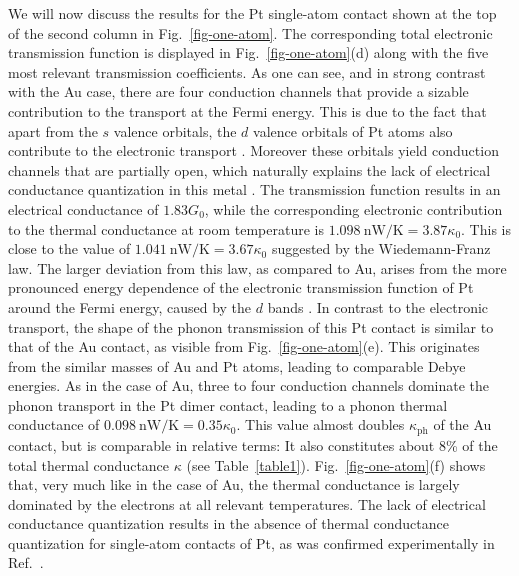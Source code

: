 \documentclass[aps,amsmath,amssymb,twocolumn,showpacs]{revtex4-1}
\begin{document}
We will now discuss the results for the Pt single-atom contact shown at the
top of the second column in Fig.~\ref{fig-one-atom}. The
corresponding total electronic transmission function is displayed in
Fig.~\ref{fig-one-atom}(d) along with the five most relevant transmission
coefficients. As one can see, and in strong contrast with the Au case,
there are four conduction channels that provide a sizable contribution to the
transport at the Fermi energy. This is due to the fact that apart from the $s$
valence orbitals, the $d$ valence orbitals of Pt atoms also contribute to the
electronic transport \cite{Sirvent1996,Pauly2006,Evangeli2015}. Moreover these
orbitals yield conduction channels that are partially open, which naturally
explains the lack of electrical conductance quantization in this metal
\cite{Nielsen2003,Smit2003,Evangeli2015}. The transmission function results in
an electrical conductance of $1.83G_0$, while the corresponding electronic
contribution to the thermal conductance at room temperature is
$1.098~\text{nW/K}=3.87\kappa_0$. This is close to the value of
$1.041~\text{nW/K}=3.67\kappa_0$ suggested by the Wiedemann-Franz law. The
larger deviation from this law, as compared to Au, arises from the more
pronounced energy dependence of the electronic transmission function of Pt
around the Fermi energy, caused by the $d$ bands
\cite{Pauly2006,Pauly2011,Evangeli2015}. In contrast to the electronic
transport, the shape of the phonon transmission of this Pt contact is similar
to that of the Au contact, as visible from Fig.~\ref{fig-one-atom}(e). This
originates from the similar masses of Au and Pt atoms, leading to comparable
Debye energies. As in the case of Au, three to four conduction channels
dominate the phonon transport in the Pt dimer contact, leading to a phonon
thermal conductance of $0.098~\text{nW/K}=0.35\kappa_0$. This value almost
doubles $\kappa_{\text{ph}}$ of the Au contact, but is comparable in relative
terms: It also constitutes about 8\% of the total thermal conductance $\kappa$
(see Table~\ref{table1}). Fig.~\ref{fig-one-atom}(f) shows that, very much
like in the case of Au, the thermal conductance is largely dominated by the
electrons at all relevant temperatures. The lack of electrical conductance
quantization results in the absence of thermal conductance quantization for
single-atom contacts of Pt, as was confirmed experimentally in
Ref.~.
\end{document}
